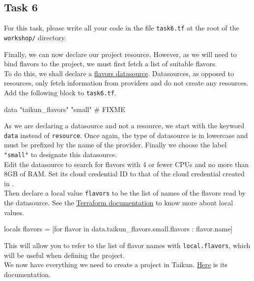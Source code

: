 \subsection{Task 6}\label{sec:task6}

\begin{note}
For this task, please write all your code in the file \texttt{task6.tf}
at the root of the \texttt{workshop/} directory.
\end{note}

Finally, we can now declare our project resource.
However, as we will need to bind flavors to the project, we must first fetch
a list of suitable flavors.\\

To do this, we shall declare a \href{https://intuinewin.github.io/taikun-docs/data-sources/flavors.html}{flavors datasource}.
Datasources, as opposed to resources, only fetch information from providers and do not create any resources.
Add the following block to \texttt{task6.tf}.
\begin{tf}
data "taikun_flavors" "small" {
  # FIXME
}
\end{tf}
As we are declaring a datasource and not a resource, we start with the keyword \texttt{data} instead of \texttt{resource}. Once again, the type of datasource is in lowercase and must be prefixed by the name of the provider.
Finally we choose the label \texttt{"small"} to designate this datasource.\\

Edit the datasource to search for flavors with 4 or fewer CPUs and no more than 8GB of RAM.
Set its cloud credential ID to that of the cloud credential created in .\\

Then declare a local value \texttt{flavors} to be the list of names of the flavors read
by the datasource.
See the \href{https://www.terraform.io/docs/language/values/locals.html}{Terraform documentation}
to know more about local values.
\begin{tf}
locals {
  flavors = [for flavor in data.taikun_flavors.small.flavors : flavor.name]
}
\end{tf}
This will allow you to refer to the list of flavor names with \texttt{local.flavors},
which will be useful when defining the project.\\

We now have everything we need to create a project in Taikun.
\href{https://intuinewin.github.io/taikun-docs/resources/project.html}{Here} is its documentation.\\

